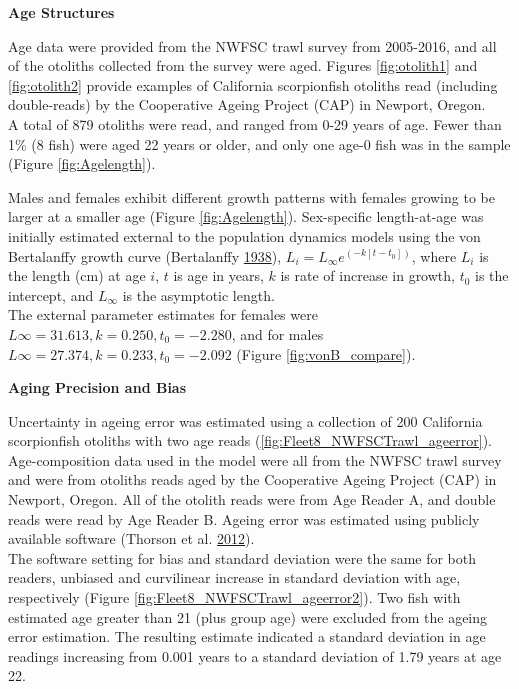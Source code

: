 \documentclass[12pt,]{article}
\begin{document}
\vspace{.5cm}

\textbf{Age Structures}

Age data were provided from the NWFSC trawl survey from 2005-2016, and
all of the otoliths collected from the survey were aged. Figures
\ref{fig:otolith1} and \ref{fig:otolith2} provide examples of California
scorpionfish otoliths read (including double-reads) by the Cooperative
Ageing Project (CAP) in Newport, Oregon.\\
A total of 879 otoliths were read, and ranged from 0-29 years of age.
Fewer than 1\% (8 fish) were aged 22 years or older, and only one age-0
fish was in the sample (Figure \ref{fig:Agelength}).

Males and females exhibit different growth patterns with females growing
to be larger at a smaller age (Figure \ref{fig:Agelength}). Sex-specific
length-at-age was initially estimated external to the population
dynamics models using the von Bertalanffy growth curve (Bertalanffy
\protect\hyperlink{ref-vonB1938}{1938}),
\(L_i = L_{\infty}e^{(-k[t-t_0])}\), where \(L_i\) is the length (cm) at
age \(i\), \(t\) is age in years, \(k\) is rate of increase in growth,
\(t_0\) is the intercept, and \(L_{\infty}\) is the asymptotic length.\\
The external parameter estimates for females were
\(L{\infty}=31.613, k = 0.250, t_0 = -2.280\), and for males
\(L{\infty}=27.374, k = 0.233, t_0 = -2.092\) (Figure
\ref{fig:vonB_compare}).

\vspace{.5cm}

\textbf{Aging Precision and Bias}

Uncertainty in ageing error was estimated using a collection of 200
California scorpionfish otoliths with two age reads
(\ref{fig:Fleet8_NWFSCTrawl_ageerror}).\\
Age-composition data used in the model were all from the NWFSC trawl
survey and were from otoliths reads aged by the Cooperative Ageing
Project (CAP) in Newport, Oregon. All of the otolith reads were from Age
Reader A, and double reads were read by Age Reader B. Ageing error was
estimated using publicly available software (Thorson et al.
\protect\hyperlink{ref-Thorson2012}{2012}).\\
The software setting for bias and standard deviation were the same for
both readers, unbiased and curvilinear increase in standard deviation
with age, respectively (Figure \ref{fig:Fleet8_NWFSCTrawl_ageerror2}).
Two fish with estimated age greater than 21 (plus group age) were
excluded from the ageing error estimation. The resulting estimate
indicated a standard deviation in age readings increasing from 0.001
years to a standard deviation of 1.79 years at age 22.
\end{document}
